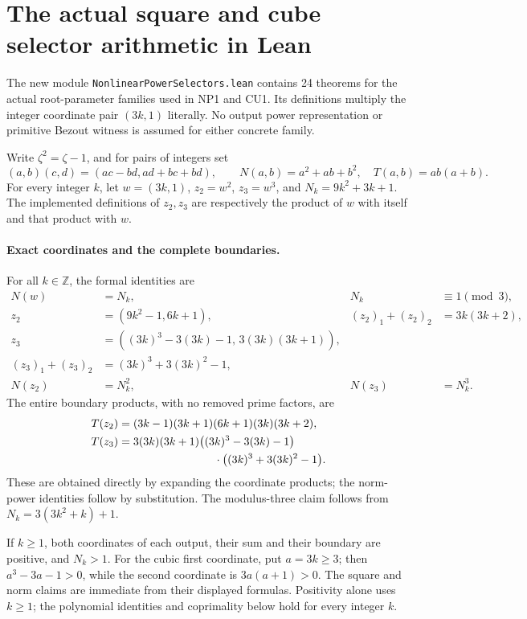 \section{The actual square and cube selector arithmetic in Lean}
\label{sec-nps18-formal-scope}

The new module
\texttt{Nonlinear\allowbreak{}Power\allowbreak{}Selectors.lean}
contains 24 theorems for the actual root-parameter families used in
NP1 and CU1. Its definitions multiply the integer coordinate pair
$(3k,1)$ literally. No output power representation or primitive
Bezout witness is assumed for either concrete family.

Write $\zeta^2=\zeta-1$, and for pairs of integers set
\[
 (a,b)(c,d)=(ac-bd,ad+bc+bd),\qquad
 N(a,b)=a^2+ab+b^2,\quad T(a,b)=ab(a+b).
\]
For every integer $k$, let $w=(3k,1)$, $z_2=w^2$, $z_3=w^3$,
and $N_k=9k^2+3k+1$. The implemented definitions of $z_2,z_3$
are respectively the product of $w$ with itself and that product
with $w$.

\paragraph{Exact coordinates and the complete boundaries.}
For all $k\in\mathbb Z$, the formal identities are
\[
 \begin{aligned}
 N(w)&=N_k, & N_k&\equiv1\pmod3,\\
 z_2&=(9k^2-1,6k+1), & (z_2)_1+(z_2)_2&=3k(3k+2),\\
 z_3&=((3k)^3-3(3k)-1,\,3(3k)(3k+1)),\\
 (z_3)_1+(z_3)_2&=(3k)^3+3(3k)^2-1,\\
 N(z_2)&=N_k^2, & N(z_3)&=N_k^3.
 \end{aligned}
\]
The entire boundary products, with no removed prime factors, are
\[
 \begin{split}
 T(z_2)&=(3k-1)(3k+1)(6k+1)(3k)(3k+2),\\
 T(z_3)&=3(3k)(3k+1)\bigl((3k)^3-3(3k)-1\bigr)\\
       &\hspace{30mm}\cdot\bigl((3k)^3+3(3k)^2-1\bigr).
 \end{split}
\]
These are obtained directly by expanding the coordinate products;
the norm-power identities follow by substitution. The modulus-three
claim follows from $N_k=3(3k^2+k)+1$.

If $k\geq1$, both coordinates of each output, their sum and their
boundary are positive, and $N_k>1$. For the cubic first coordinate,
put $a=3k\geq3$; then $a^3-3a-1>0$, while the second coordinate
is $3a(a+1)>0$. The square and norm claims are immediate from their
displayed formulas. Positivity alone uses $k\geq1$; the polynomial
identities and coprimality below hold for every integer $k$.

